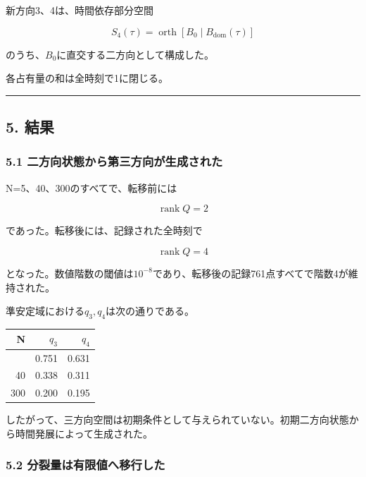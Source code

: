 \documentclass[
  a4paper,
]{ltjsarticle}
\newcounter{none} %
\begin{document}
新方向3、4は、時間依存部分空間

\[
S_4(\tau)=\operatorname{orth}[B_0\mid B_{\mathrm{dom}}(\tau)]
\]

のうち、\(B_0\)に直交する二方向として構成した。

各占有量の和は全時刻で1に閉じる。

\begin{center}\rule{0.5\linewidth}{0.5pt}\end{center}

\subsection{5. 結果}\label{ux7d50ux679c}

\subsubsection{5.1
二方向状態から第三方向が生成された}\label{ux4e8cux65b9ux5411ux72b6ux614bux304bux3089ux7b2cux4e09ux65b9ux5411ux304cux751fux6210ux3055ux308cux305f}

N=5、40、300のすべてで、転移前には

\[
\operatorname{rank}Q=2
\]

であった。転移後には、記録された全時刻で

\[
\operatorname{rank}Q=4
\]

となった。数値階数の閾値は\(10^{-8}\)であり、転移後の記録761点すべてで階数4が維持された。

準安定域における\(q_3,q_4\)は次の通りである。

{\def\LTcaptype{none} %
\begin{longtable}[]{@{}rrr@{}}
\toprule\noalign{}
N & \(q_3\) & \(q_4\) \\
\midrule\noalign{}
\endhead
\bottomrule\noalign{}
\endlastfoot
5 & 0.751 & 0.631 \\
40 & 0.338 & 0.311 \\
300 & 0.200 & 0.195 \\
\end{longtable}
}

したがって、三方向空間は初期条件として与えられていない。初期二方向状態から時間発展によって生成された。

\subsubsection{5.2
分裂量は有限値へ移行した}\label{ux5206ux88c2ux91cfux306fux6709ux9650ux5024ux3078ux79fbux884cux3057ux305f}
\end{document}
